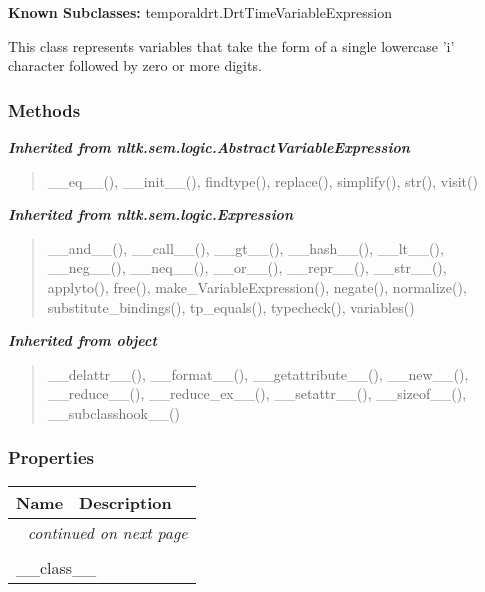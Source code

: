 \textbf{Known Subclasses:} temporaldrt.DrtTimeVariableExpression

This class represents variables that take the form of a single lowercase 
'i' character followed by zero or more digits.



  \subsubsection{Methods}


\large{\textbf{\textit{Inherited from nltk.sem.logic.AbstractVariableExpression}}}

\begin{quote}
\_\_eq\_\_(), \_\_init\_\_(), findtype(), replace(), simplify(), str(), visit()
\end{quote}

\large{\textbf{\textit{Inherited from nltk.sem.logic.Expression}}}

\begin{quote}
\_\_and\_\_(), \_\_call\_\_(), \_\_gt\_\_(), \_\_hash\_\_(), \_\_lt\_\_(), \_\_neg\_\_(), \_\_neq\_\_(), \_\_or\_\_(), \_\_repr\_\_(), \_\_str\_\_(), applyto(), free(), make\_VariableExpression(), negate(), normalize(), substitute\_bindings(), tp\_equals(), typecheck(), variables()
\end{quote}

\large{\textbf{\textit{Inherited from object}}}

\begin{quote}
\_\_delattr\_\_(), \_\_format\_\_(), \_\_getattribute\_\_(), \_\_new\_\_(), \_\_reduce\_\_(), \_\_reduce\_ex\_\_(), \_\_setattr\_\_(), \_\_sizeof\_\_(), \_\_subclasshook\_\_()
\end{quote}


  \subsubsection{Properties}

    \vspace{-1cm}
\hspace{\varindent}\begin{longtable}{|p{\varnamewidth}|p{\vardescrwidth}|l}
\cline{1-2}
\cline{1-2} \centering \textbf{Name} & \centering \textbf{Description}& \\
\cline{1-2}
\endhead\cline{1-2}\multicolumn{3}{r}{\small\textit{continued on next page}}\\\endfoot\cline{1-2}
\endlastfoot\multicolumn{2}{|l|}{\textit{Inherited from object}}\\
\multicolumn{2}{|p{\varwidth}|}{\raggedright \_\_class\_\_}\\
\cline{1-2}
\end{longtable}


